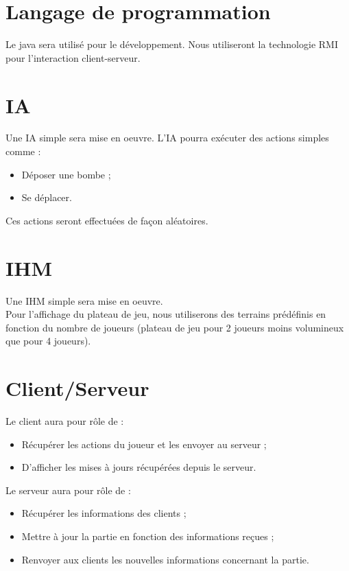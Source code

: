 \section{Langage de programmation}

Le java sera utilisé pour le développement. Nous utiliseront la technologie RMI pour l'interaction client-serveur.

\section{IA}

Une IA simple sera mise en oeuvre. L'IA pourra exécuter des actions simples comme :
\begin{itemize}
	\item Déposer une bombe ;
	\item Se déplacer.
\end{itemize}
Ces actions seront effectuées de façon aléatoires.

\section{IHM}

Une IHM simple sera mise en oeuvre.\\

Pour l'affichage du plateau de jeu, nous utiliserons des terrains prédéfinis en fonction du nombre de joueurs (plateau de jeu pour 2 joueurs moins volumineux que pour 4 joueurs).

\section{Client/Serveur}

Le client aura pour rôle de :
\begin{itemize}
	\item Récupérer les actions du joueur et les envoyer au serveur ;
	\item D'afficher les mises à jours récupérées depuis le serveur.
\end{itemize}

Le serveur aura pour rôle de :
\begin{itemize}
	\item Récupérer les informations des clients ;
	\item Mettre à jour la partie en fonction des informations reçues ;
	\item Renvoyer aux clients les nouvelles informations concernant la partie.
\end{itemize}